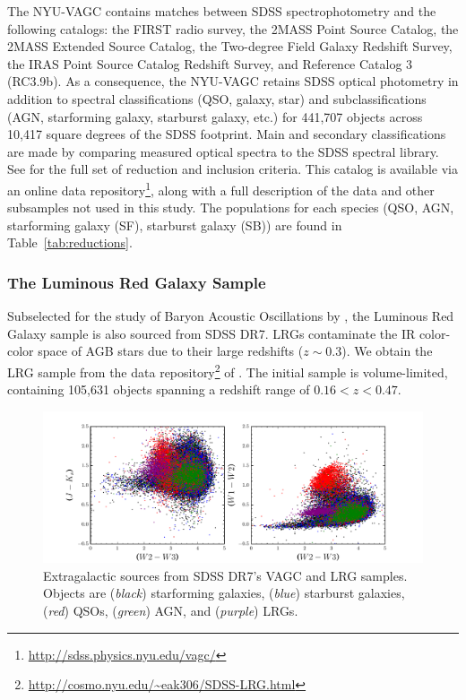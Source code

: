 The NYU-VAGC contains matches between SDSS spectrophotometry and the following catalogs: the FIRST radio survey, the 2MASS Point Source Catalog, the 2MASS Extended Source Catalog, the Two-degree Field Galaxy Redshift Survey, the IRAS Point Source Catalog Redshift Survey, and Reference Catalog 3 (RC3.9b). As a consequence, the NYU-VAGC retains SDSS optical photometry in addition to spectral classifications (QSO, galaxy, star) and subclassifications (AGN, starforming galaxy, starburst galaxy, etc.) for 441,707 objects across 10,417 square degrees of the SDSS footprint. Main and secondary classifications are made by comparing measured optical spectra to the SDSS spectral library. See \cite{2005AJ....129.2562B} for the full set of reduction and inclusion criteria. This catalog is available via an online data repository\footnote{\url{http://sdss.physics.nyu.edu/vagc/}}, along with a full description of the data and other subsamples not used in this study. The populations for each species (QSO, AGN, starforming galaxy (SF), starburst galaxy (SB)) are found in Table~\ref{tab:reductions}.

\subsubsection{The Luminous Red Galaxy Sample}
Subselected for the study of Baryon Acoustic Oscillations by \cite{2010ApJ...710.1444K}, the Luminous Red Galaxy sample \citep[LRGs;][]{2001AJ....122.2267E} is also sourced from SDSS DR7. LRGs contaminate the IR color-color space of AGB stars due to their large redshifts ($z\sim0.3$). We obtain the  LRG sample from the data repository\footnote{\url{http://cosmo.nyu.edu/~eak306/SDSS-LRG.html}} of \cite{2010ApJ...710.1444K}. The initial sample is volume-limited, containing 105,631 objects spanning a redshift range of $0.16 < z < 0.47$.

\begin{figure}[h]
\includegraphics[width=6in]{figs/contaminant_color_color_distr.pdf}
\caption{Extragalactic sources from SDSS DR7's VAGC and LRG samples. Objects are (\emph{black}) starforming galaxies, (\emph{blue}) starburst galaxies, (\emph{red}) QSOs, (\emph{green}) AGN, and (\emph{purple}) LRGs. \label{fig:wisecontaminants}}
\end{figure}

